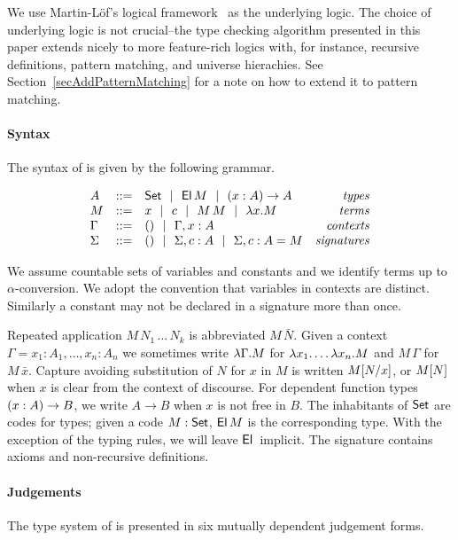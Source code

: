 
We use Martin-L\"of's logical
framework~\cite{nordstroemPeterssonSmith:handbookLICS} as the underlying logic.
%
The choice of underlying logic is not crucial--the type checking algorithm
presented in this paper extends nicely to more feature-rich logics with, for
instance, recursive definitions, pattern matching, and universe hierachies.
\if {}
See Section~\ref{secAddPatternMatching} for a note on how to extend it to
pattern matching.
\fi

\paragraph*{Syntax} The syntax of {\Core} is given by the following grammar.

\[\begin{array}{lclr}
    A	   & ::= & \SET \Or \EL M \Or \PI xAA	      & \mathit{types} \\
    M	   & ::= & x \Or c \Or M\,M \Or \LAM xM	      & \mathit{terms} \\
    \Gamma & ::= & () \Or \Gamma,x:A		      & \mathit{contexts} \\
    \Sigma & ::= & () \Or \Sigma,c:A \Or \Sigma,c:A=M & \mathit{signatures} \\
\end{array}\]

We assume countable sets of variables and constants and we identify terms up to
$\alpha$-conversion. We adopt the convention that variables in contexts are
distinct. Similarly a constant may not be declared in a signature more than
once.

Repeated application $M \, N_1 \, \dots \, N_k$ is abbreviated $M \, \bar N$.
%
Given a context $\Gamma = x_1 : A_1, \ldots, x_n : A_n$ we sometimes write
$\LAM \Gamma M$ for $\LAM {x_1} \ldots \LAM {x_n} M$ and $M \, \Gamma$ for $M
\, \bar x$.
%
Capture avoiding substitution of $N$ for $x$ in $M$ is written $\Subst M x N$,
or $\SubstD M N$ when $x$ is clear from the context of discourse.
%
For dependent function types $\PI xAB$, we write $A \to B$ when $x$ is not free
in $B$.
%
The inhabitants of $\SET$ are codes for types; given a code $M : \SET$, $\EL M$
is the corresponding type. With the exception of the typing rules, we will
leave $\EL{}$ implicit.
%
The signature contains axioms and non-recursive definitions.

\paragraph*{Judgements} The type system of {\Core} is presented in six mutually
dependent judgement forms.

